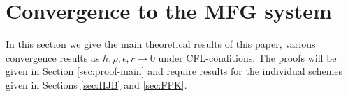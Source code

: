 \documentclass[a4paper,  twoside, 10pt, leqno]{amsart}
\newcommand{\zd}{\mathbb{Z}^d}
\newtheorem{algorithm}[thm]{Algorithm}
\theoremstyle{remark}
\theoremstyle{definition}
\begin{document}





\section{Convergence to the MFG system} \label{subsec:main-result}
 In this section we give the main theoretical results of this paper, various convergence results as $h,\rho,\epsilon,r \to 0$
 under CFL-conditions. The proofs will be given in Section \ref{sec:proof-main} and %
 require results for the individual schemes given in Sections \ref{sec:HJB} and \ref{sec:FPK}.
\end{document}
